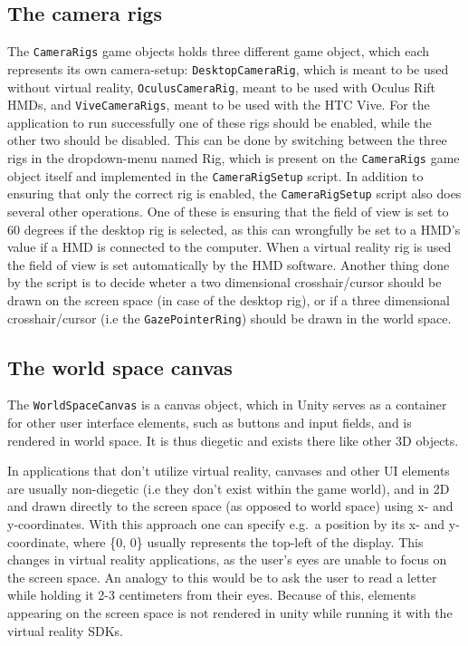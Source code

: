 \subsection{The camera rigs}
The \texttt{CameraRigs} game objects holds three different game object, which each represents its own camera-setup: \texttt{DesktopCameraRig}, which is meant to be used
without virtual reality, \texttt{OculusCameraRig}, meant to be used with Oculus Rift HMDs, and \texttt{ViveCameraRigs}, meant to be used with the HTC Vive.
For the application to run successfully one of these rigs should be enabled, while the other two should be disabled.
This can be done by switching between the three rigs in the dropdown-menu named Rig, which is present on the \texttt{CameraRigs} game object itself and
implemented in the \texttt{CameraRigSetup} script. In addition to ensuring that only the correct rig is enabled, 
the \texttt{CameraRigSetup} script also does several other operations. One of these is ensuring that the field of view is set to 60 degrees if the desktop rig 
is selected, as this can wrongfully be set to a HMD's value if a HMD is connected to the computer. When a virtual reality rig is used the field of view is 
set automatically by the HMD software. Another thing done by the script is to decide wheter a two dimensional crosshair/cursor should be drawn on the screen space
(in case of the desktop rig), or if a three dimensional crosshair/cursor (i.e the \texttt{GazePointerRing}) should be drawn in the world space. 

\subsection{The world space canvas}
The \texttt{WorldSpaceCanvas} is a canvas object, which in Unity serves as a container for other user interface elements, such as buttons and input fields, 
and is rendered in world space. It is thus diegetic and exists there like other 3D objects.

In applications that don't utilize virtual reality, canvases and other UI elements are usually non-diegetic (i.e they don't exist within the game world), 
and in 2D and drawn directly to the screen space (as opposed to world space) using x- and y-coordinates.
With this approach one can specify e.g.~a position by its x- and y-coordinate, where \{0, 0\} usually represents the top-left of the display.
This changes in virtual reality applications, as the user's eyes are unable to focus on the screen space. An analogy to this would be to 
ask the user to read a letter while holding it 2-3 centimeters from their eyes. Because of this, elements appearing on the screen space is not rendered
in unity while running it with the virtual reality SDKs. 

